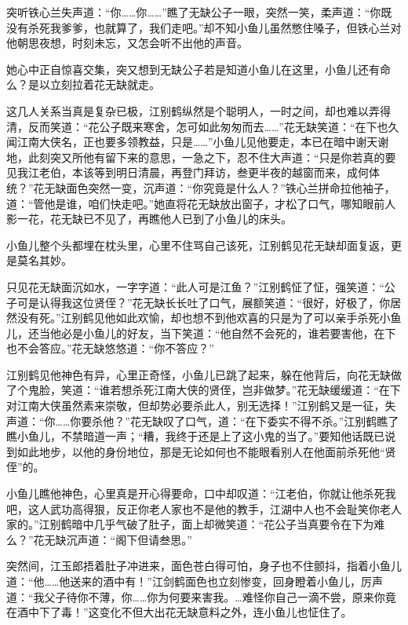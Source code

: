 \documentclass[12pt,oneside]{book}
\begin{document}
突听铁心兰失声道：``你\ldots\ldots 你\ldots\ldots{}''瞧了无缺公子一眼，突然一笑，柔声道：``你既没有杀死我爹爹，也就算了，我们走吧。''却不知小鱼儿虽然憋住嗓子，但铁心兰对他朝思夜想，时刻未忘，又怎会听不出他的声音。

她心中正自惊喜交集，突又想到无缺公子若是知道小鱼儿在这里，小鱼儿还有命么？是以立刻拉着花无缺就走。

这几人关系当真是复杂已极，江别鹤纵然是个聪明人，一时之间，却也难以弄得清，反而笑道：``花公子既来寒舍，怎可如此匆匆而去\ldots\ldots{}''花无缺笑道：``在下也久闻江南大侠名，正也要多领教益，只是\ldots\ldots{}''小鱼儿见他要走，本已在暗中谢天谢地，此刻突又所他有留下来的意思，一急之下，忍不住大声道：``只是你若真的要见我江老伯，本该等到明日清晨，再登门拜访，叁更半夜的越窗而来，成何体统？''花无缺面色突然一变，沉声道：``你究竟是什么人？''铁心兰拼命拉他袖子，道：``管他是谁，咱们快走吧。''她直将花无缺放出窗子，才松了口气，哪知眼前人影一花，花无缺已不见了，再瞧他人已到了小鱼儿的床头。

小鱼儿整个头都埋在枕头里，心里不住骂自己该死，江别鹤见花无缺却面复返，更是莫名其妙。

只见花无缺面沉如水，一字字道：``此人可是江鱼？''江别鹤怔了怔，强笑道：``公子可是认得我这位贤侄？''花无缺长长吐了口气，展额笑道：``很好，好极了，你居然没有死。''江别鹤见他如此欢愉，却也想不到他欢喜的只是为了可以亲手杀死小鱼儿，还当他必是小鱼儿的好友，当下笑道：``他自然不会死的，谁若要害他，在下也不会答应。''花无缺悠悠道：``你不答应？''

江别鹤见他神色有异，心里正奇怪，小鱼儿已跳了起来，躲在他背后，向花无缺做了个鬼脸，笑道：``谁若想杀死江南大侠的贤侄，岂非做梦。''花无缺缓缓道：``在下对江南大侠虽然素来崇敬，但却势必要杀此人，别无选择！''江别鹤又是一征，失声道：``你\ldots\ldots 你要杀他？''花无缺叹了口气，道：``在下委实不得不杀。''江别鹤瞧了瞧小鱼儿，不禁暗道一声；``糟，我终于还是上了这小鬼的当了。''要知他话既已说到如此地步，以他的身份地位，那是无论如何也不能眼看别人在他面前杀死他``贤侄''的。

小鱼儿瞧他神色，心里真是开心得要命，口中却叹道：``江老伯，你就让他杀死我吧，这人武功高得狠，反正你老人家也不是他的教手，江湖中人也不会耻笑你老人家的。''江别鹤暗中几乎气破了肚子，面上却微笑道：``花公子当真要令在下为难么？''花无缺沉声道：``阁下但请叁思。''

突然间，江玉郎捂着肚子冲进来，面色苍白得可怕，身子也不住颤抖，指着小鱼儿道：``他\ldots\ldots 他送来的酒中有！''江剑鹤面色也立刻惨变，回身瞪着小鱼儿，厉声道：``我父子待你不薄，你\ldots\ldots 你为何要来害我。\ldots 难怪你自己一滴不尝，原来你竟在酒中下了毒！''这变化不但大出花无缺意料之外，连小鱼儿也怔住了。
\end{document}
